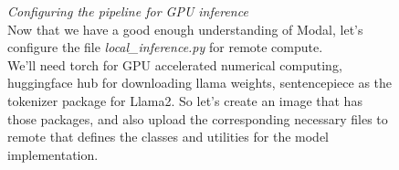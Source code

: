 \documentclass[12pt]{article}
\newcommand{\customtext}[3]{%
    \vspace{#2} %
    \fontsize{13}{8}\textcolor{#1}{\textit{#3}}%
}
\begin{document}
\pagebreak
\begin{figure}[!htb]
    \begin{minipage}[t]{0.65\textwidth}
    \raggedright
    \customtext{xtitle}{0em}{Configuring the pipeline for GPU inference}\\
Now that we have a good enough understanding of Modal, let's configure the file
{\it \small local\_inference.py} for remote compute.\\
We'll need torch for GPU accelerated numerical computing, huggingface hub for downloading 
llama weights, sentencepiece as the tokenizer package for Llama2. So let's create 
an image that has those packages, and also upload the corresponding necessary files to remote 
that defines the classes and utilities for the model implementation.


\end{minipage}
\end{figure}
\end{document}
